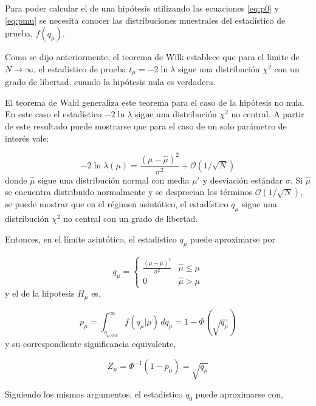 Para poder calcular el {\pvalue} de una hipótesis utilizando las ecuaciones
\eqref{eq:p0} y \eqref{eq:pmu} se necesita conocer las distribuciones muestrales
del estadístico de prueba, $f(q_\mu)$.

Como se dijo anteriormente, el teorema de Wilk establece que para el limite de
$N\to\infty$, el estadístico de prueba $t_\mu = -2\ln \lambda$ sigue una
distribución $\chi^2$ con un grado de libertad, cuando la hipótesis nula es verdadera.

El teorema de Wald\cite{WaldTheo} generaliza este teorema para el caso de la hipótesis no nula.
En este caso el estadístico $-2\ln\lambda$ sigue una distribución $\chi^2$ no central.
A partir de este resultado puede mostrarse que para el caso de un solo parámetro de interés vale:

\begin{equation}
  -2 \ln \lambda(\mu) = \frac{(\mu - \hat{\mu})^2}{\sigma^2} + \mathcal{O}(1/\sqrt{N})
\end{equation}
%
donde $\hat{\mu}$ sigue una distribución normal con media $\mu'$ y desviación
estándar $\sigma$. Si $\hat{\mu}$ se encuentra distribuido normalmente y se
desprecian los términos $\mathcal{O}(1/\sqrt{N})$, se puede mostrar que en el
régimen asintótico, el estadístico $q_\mu$ sigue una distribución $\chi^2$ no
central con un grado de libertad.

Entonces, en el límite asintótico, el estadistico $q_\mu$ puede aproximarse por

\begin{equation}
  q_\mu =
  \begin{cases}
    \frac{(\mu-\hat{\mu})^2}{\sigma^2} & \hat{\mu} \leq \mu \\
    0 & \hat{\mu} > \mu
  \end{cases}
\end{equation}
%
y el {\pvalue} de la hipotesis $H_\mu$ es,

\begin{equation}
  p_\mu = \int_{q_{\mu,\text{obs}}}^{\infty} f(q_\mu|\mu) \, dq_\mu = 1 - \Phi(\sqrt{q_\mu})
\end{equation}
%
y su correspondiente significancia equivalente,

\begin{equation}
  Z_\mu = \Phi^{-1}(1-p_\mu) = \sqrt{q_\mu}
\end{equation}

Siguiendo los mismos argumentos, el estadistico $q_0$ puede aproximarse con,

